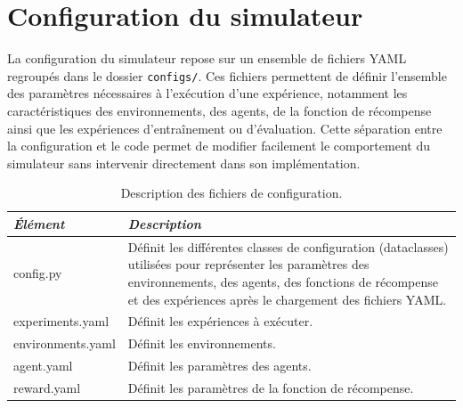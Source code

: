 \section{Configuration du simulateur}
\label{sec:configuration}

\noindent La configuration du simulateur repose sur un ensemble de fichiers YAML regroupés dans le dossier \texttt{configs/}. Ces fichiers permettent de définir l'ensemble des paramètres nécessaires à l'exécution d'une expérience, notamment les caractéristiques des environnements, des agents, de la fonction de récompense ainsi que les expériences d'entraînement ou d'évaluation. Cette séparation entre la configuration et le code permet de modifier facilement le comportement du simulateur sans intervenir directement dans son implémentation.

\begin{table}[h]
    \centering
    \caption{Description des fichiers de configuration.}
    \label{tab:config_files}
    \begin{tabularx}{\textwidth}{>{\ttfamily\small}l X}
        \toprule
        \textnormal{\textit{Élément}} & \textit{Description}                                                                                                                                                                                                           \\
        \midrule
        config.py                     & Définit les différentes classes de configuration (dataclasses) utilisées pour représenter les paramètres des environnements, des agents, des fonctions de récompense et des expériences après le chargement des fichiers YAML. \\

        experiments.yaml              & Définit les expériences à exécuter.                                                                                                                                                                                            \\

        environments.yaml             & Définit les environnements.                                                                                                                                                                                                    \\

        agent.yaml                    & Définit les paramètres des agents.                                                                                                                                                                                             \\

        reward.yaml                   & Définit les paramètres de la fonction de récompense.                                                                                                                                                                           \\


        \bottomrule
    \end{tabularx}
\end{table}

